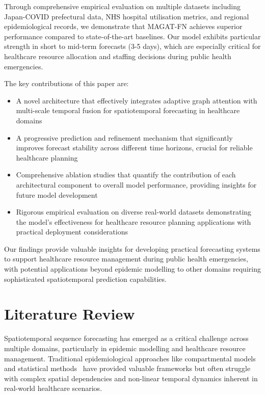 \documentclass[lettersize, journal]{IEEEtran}
\begin{document}
Through comprehensive empirical evaluation on multiple datasets including Japan-COVID prefectural data, NHS hospital utilisation metrics, and regional epidemiological records, we demonstrate that MAGAT-FN achieves superior performance compared to state-of-the-art baselines. Our model exhibits particular strength in short to mid-term forecasts (3-5 days), which are especially critical for healthcare resource allocation and staffing decisions during public health emergencies.

The key contributions of this paper are:
\begin{itemize}
\item A novel architecture that effectively integrates adaptive graph attention with multi-scale temporal fusion for spatiotemporal forecasting in healthcare domains
\item A progressive prediction and refinement mechanism that significantly improves forecast stability across different time horizons, crucial for reliable healthcare planning
\item Comprehensive ablation studies that quantify the contribution of each architectural component to overall model performance, providing insights for future model development
\item Rigorous empirical evaluation on diverse real-world datasets demonstrating the model's effectiveness for healthcare resource planning applications with practical deployment considerations
\end{itemize}

Our findings provide valuable insights for developing practical forecasting systems to support healthcare resource management during public health emergencies, with potential applications beyond epidemic modelling to other domains requiring sophisticated spatiotemporal prediction capabilities.

\section{Literature Review}
Spatiotemporal sequence forecasting has emerged as a critical challenge across multiple domains, particularly in epidemic modelling and healthcare resource management. Traditional epidemiological approaches like compartmental models~\cite{compartmentalmodel} and statistical methods~\cite{sirbasedmodel} have provided valuable frameworks but often struggle with complex spatial dependencies and non-linear temporal dynamics inherent in real-world healthcare scenarios.
\end{document}
